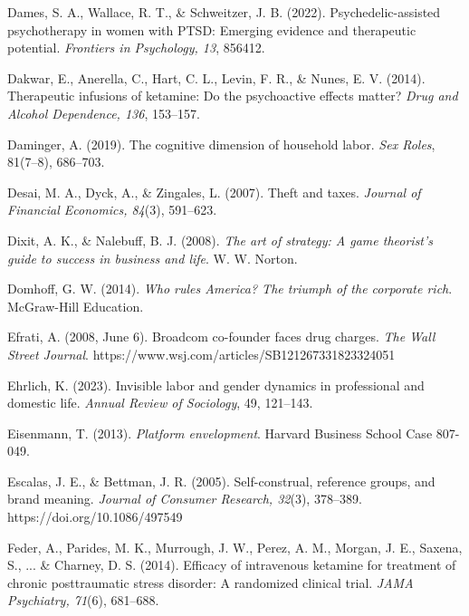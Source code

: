 \begin{thebibliography}{}
    Dames, S. A., Wallace, R. T., \& Schweitzer, J. B. (2022). Psychedelic-assisted psychotherapy in women with PTSD: Emerging evidence and therapeutic potential. \textit{Frontiers in Psychology, 13}, 856412.

    Dakwar, E., Anerella, C., Hart, C. L., Levin, F. R., \& Nunes, E. V. (2014). Therapeutic infusions of ketamine: Do the psychoactive effects matter? \textit{Drug and Alcohol Dependence, 136}, 153–157.

    Daminger, A. (2019). The cognitive dimension of household labor. \textit{Sex Roles}, 81(7–8), 686–703.

    Desai, M. A., Dyck, A., \& Zingales, L. (2007). Theft and taxes. \textit{Journal of Financial Economics, 84}(3), 591–623.

    Dixit, A. K., \& Nalebuff, B. J. (2008). \textit{The art of strategy: A game theorist’s guide to success in business and life}. W. W. Norton.

    Domhoff, G. W. (2014). \textit{Who rules America? The triumph of the corporate rich}. McGraw-Hill Education.


    Efrati, A. (2008, June 6). Broadcom co-founder faces drug charges. \textit{The Wall Street Journal}. https://www.wsj.com/articles/SB121267331823324051
    
    Ehrlich, K. (2023). Invisible labor and gender dynamics in professional and domestic life. \textit{Annual Review of Sociology}, 49, 121–143.

    Eisenmann, T. (2013). \textit{Platform envelopment}. Harvard Business School Case 807-049.

    Escalas, J. E., \& Bettman, J. R. (2005). Self-construal, reference groups, and brand meaning. \textit{Journal of Consumer Research, 32}(3), 378--389. https://doi.org/10.1086/497549


    Feder, A., Parides, M. K., Murrough, J. W., Perez, A. M., Morgan, J. E., Saxena, S., ... \& Charney, D. S. (2014). Efficacy of intravenous ketamine for treatment of chronic posttraumatic stress disorder: A randomized clinical trial. \textit{JAMA Psychiatry, 71}(6), 681–688.


\end{thebibliography}
